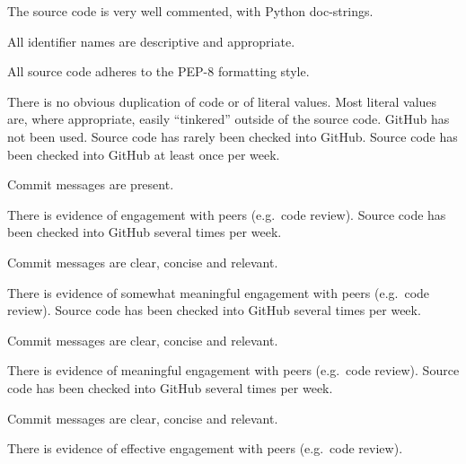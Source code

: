 \documentclass{../../fal_assignment}
\begin{document}
\begin{markingrubric}
\grade The source code is very well commented, with Python doc-strings.
\par All identifier names are descriptive and appropriate.
\par All source code adheres to the PEP-8 formatting style.
\par There is no obvious duplication of code or of literal values. Most literal values are, where appropriate, easily ``tinkered'' outside of the source code.  	
		\grade\fail GitHub has not been used.
		\grade Source code has rarely been checked into GitHub.
		\grade Source code  has been checked into GitHub at least once per week.
			\par Commit messages are present.
			\par There is evidence of engagement with peers (e.g.\ code review).
		\grade Source code  has been checked into GitHub several times per week.
			\par Commit messages are clear, concise and relevant.
			\par There is evidence of somewhat meaningful engagement with peers (e.g.\ code review).
		\grade Source code has been checked into GitHub several times per week.
			\par Commit messages are clear, concise and relevant.
			\par There is evidence of meaningful engagement with peers (e.g.\ code review).
		\grade Source code has been checked into GitHub several times per week.
			\par Commit messages are clear, concise and relevant.
			\par There is evidence of effective engagement with peers (e.g.\ code review).
\end{markingrubric}
\end{document}
